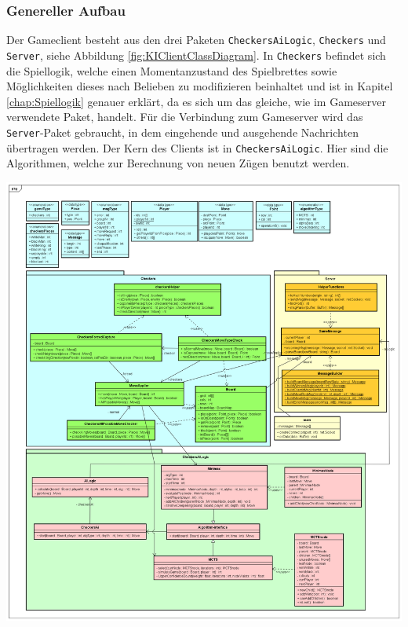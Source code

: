 \documentclass[12pt,a4paper,bibliography=totocnumbered,listof=totocnumbered]{article}
\begin{document}
\subsubsection{Genereller Aufbau}
Der Gameclient besteht aus den drei Paketen \texttt{CheckersAiLogic}, \texttt{Checkers} und \texttt{Server}, siehe Abbildung \ref{fig:KIClientClassDiagram}. 
In \texttt{Checkers} befindet sich die Spiellogik, welche einen Momentanzustand des Spielbrettes sowie Möglichkeiten dieses nach Belieben zu modifizieren beinhaltet 
und ist in Kapitel \ref{chap:Spiellogik} genauer erklärt, da es sich um das gleiche, wie im Gameserver verwendete Paket, handelt. 
Für die Verbindung zum Gameserver wird das \texttt{Server}-Paket gebraucht, in dem eingehende und ausgehende Nachrichten übertragen werden.
Der Kern des Clients ist in \texttt{CheckersAiLogic}. Hier sind die Algorithmen, welche zur Berechnung von neuen Zügen 
benutzt werden.

\vspace{1em}
\begin{minipage}{\linewidth}
	\centering
	\includegraphics[width=0.9\linewidth]{pics/GameClientClassDiagram.png}
	\label{fig:KIClientClassDiagram}
\end{minipage}
\end{document}
